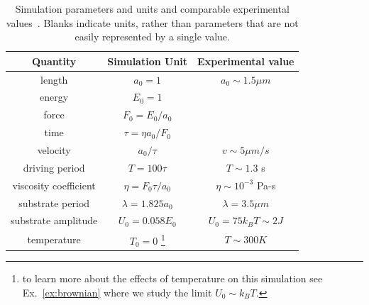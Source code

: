 \documentclass[twocolumn,preprintnumbers,amsmath,amssymb,aps,prx]{revtex4}
\begin{document}
\begin{table}[h!]
\centering
\caption{Simulation parameters and units and comparable
  experimental values~\cite{Juniper2015}.
  Blanks %
  indicate
  units, rather than parameters that
  are not easily represented by a single value.}
\begin{ruledtabular}
\begin{tabular}{c c c } %
Quantity & Simulation Unit & Experimental value\\
\hline
length &  $a_0 = 1$ & $ a_0 \sim 1.5 \mu m$\\
energy & $E_0 = 1$ & \\ %
force & $F_0 = E_0 / a_0$ & \\ %
time &  $ \tau = \eta a_0 / F_0 $ \\ %
velocity &  $ a_0 / \tau $ &  $v \sim 5 \mu m/s $\\
driving period & $T = 100 \tau$ & $T \sim 1.3$ s \\
viscosity coefficient & $\eta = F_0 \tau / a_0 $ & $\eta \sim 10^{-3}$ Pa-s \\
substrate period & $\lambda = 1.825 a_0$ & $\lambda = 3.5 \mu m$ \\
substrate amplitude & $U_0 = 0.058 E_0$ & $U_0 = 75 k_B T \sim 2 J$ \\
temperature & $T_0 = 0$ \footnote{to learn more about the effects
  of temperature on this simulation
  see Ex.~\ref{ex:brownian} where we study the limit
  $U_0 \sim k_B T$.} & $T \sim 300K $ \\


\end{tabular}
\end{ruledtabular}
\end{table}
\end{document}
